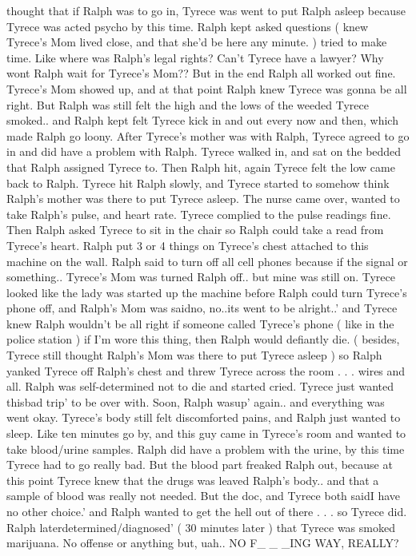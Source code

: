 \documentclass[12pt]{book}
\begin{document}
thought that if Ralph was to go in, Tyrece was went to put Ralph asleep because Tyrece was acted psycho by this time. Ralph kept asked questions ( knew Tyrece's Mom lived close, and that she'd be here any minute. ) tried to make time. Like where was Ralph's legal rights? Can't Tyrece have a lawyer? Why wont Ralph wait for Tyrece's Mom?? But in the end Ralph all worked out fine. Tyrece's Mom showed up, and at that point Ralph knew Tyrece was gonna be all right. But Ralph was still felt the high and the lows of the weeded Tyrece smoked.. and Ralph kept felt Tyrece kick in and out every now and then, which made Ralph go loony. After Tyrece's mother was with Ralph, Tyrece agreed to go in and did have a problem with Ralph. Tyrece walked in, and sat on the bedded that Ralph assigned Tyrece to. Then Ralph hit, again Tyrece felt the low came back to Ralph. Tyrece hit Ralph slowly, and Tyrece started to somehow think Ralph's mother was there to put Tyrece asleep. The nurse came over, wanted to take Ralph's pulse, and heart rate. Tyrece complied to the pulse readings fine. Then Ralph asked Tyrece to sit in the chair so Ralph could take a read from Tyrece's heart. Ralph put 3 or 4 things on Tyrece's chest attached to this machine on the wall. Ralph said to turn off all cell phones because if the signal or something.. Tyrece's Mom was turned Ralph off.. but mine was still on. Tyrece looked like the lady was started up the machine before Ralph could turn Tyrece's phone off, and Ralph's Mom was saidno, no..its went to be alright..' and Tyrece knew Ralph wouldn't be all right if someone called Tyrece's phone ( like in the police station ) if I'm wore this thing, then Ralph would defiantly die. ( besides, Tyrece still thought Ralph's Mom was there to put Tyrece asleep ) so Ralph yanked Tyrece off Ralph's chest and threw Tyrece across the room  . . .  wires and all. Ralph was self-determined not to die and started cried. Tyrece just wanted thisbad trip' to be over with. Soon, Ralph wasup' again.. and everything was went okay. Tyrece's body still felt discomforted pains, and Ralph just wanted to sleep. Like ten minutes go by, and this guy came in Tyrece's room and wanted to take blood/urine samples. Ralph did have a problem with the urine, by this time Tyrece had to go really bad. But the blood part freaked Ralph out, because at this point Tyrece knew that the drugs was leaved Ralph's body.. and that a sample of blood was really not needed. But the doc, and Tyrece both saidI have no other choice.' and Ralph wanted to get the hell out of there  . . .  so Tyrece did. Ralph laterdetermined/diagnosed' ( 30 minutes later ) that Tyrece was smoked marijuana. No offense or anything but, uah.. NO F\_ \_ \_ING WAY, REALLY?
\end{document}
